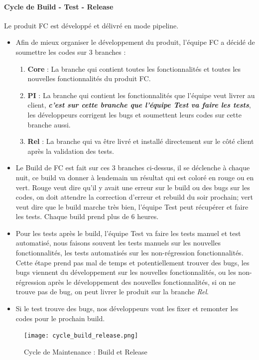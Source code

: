     \paragraph{Cycle de Build - Test - Release}
    \par Le produit FC est développé et délivré en mode pipeline.
    \begin{itemize}[label=\textbullet]
    	\item Afin de mieux organiser le développement du produit, l'équipe FC a décidé de soumettre les codes sur 3 branches : 
    	\begin{enumerate}
    		\item \textbf{Core} : La branche qui contient toutes les fonctionnalités et toutes les nouvelles fonctionnalités du produit FC.
    		\item \textbf{PI} : La branche qui contient les fonctionnalités que l'équipe veut livrer au client, \textbf{\textit{c'est sur cette branche que l'équipe Test va faire les tests}}, les développeurs corrigent les bugs et soumettent leurs codes sur cette branche aussi.
    		\item \textbf{Rel} : La branche qui va être livré et installé directement sur le côté client après la validation des tests.
    	\end{enumerate}
        \item Le Build de FC est fait sur ces 3 branches ci-dessus, il se déclenche à chaque nuit, ce build va donner à lendemain un résultat qui est coloré en rouge ou en vert. Rouge veut dire qu'il y avait une erreur sur le build ou des bugs sur les codes, on doit attendre la correction d'erreur et rebuild du soir prochain; vert veut dire que le build marche très bien, l'équipe Test peut récupérer et faire les tests. Chaque build prend plus de 6 heures.
        \item Pour les tests après le build, l'équipe Test va faire les tests manuel et test automatisé, nous faisons souvent les tests manuels sur les nouvelles fonctionnalités, les tests automatisés sur les non-régression fonctionnalités. Cette étape prend pas mal de temps et potentiellement trouver des bugs, les bugs viennent du développement sur les nouvelles fonctionnalités, ou les non-régression après le développement des nouvelles fonctionnalités, si on ne trouve pas de bug, on peut livrer le produit sur la branche \textit{Rel}.
        \item Si le test trouve des bugs, nos développeurs vont les fixer et remonter les codes pour le prochain build. 
    \end{itemize}
    \begin{figure}[H]
        \centering
        \texttt{[image: cycle\_build\_release.png]}
        \caption{Cycle de Maintenance : Build et Release}
        \label{fig:cycle_maintenance_release_build}
    \end{figure}
    
